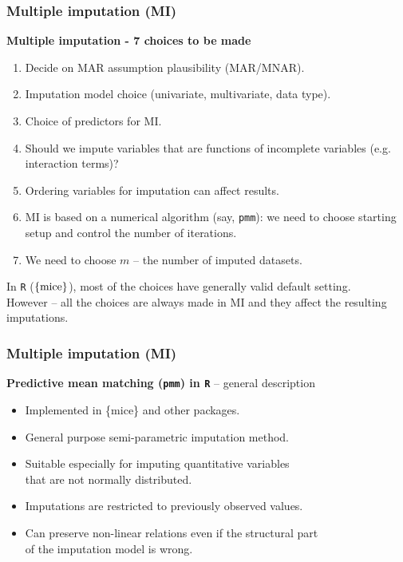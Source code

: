 \documentclass{beamer}
\begin{document}
\begin{frame}
\frametitle{Multiple imputation (MI)}
\textbf{Multiple imputation - 7 choices to be made}\\
\smallskip
\begin{enumerate}
    \item Decide on MAR assumption plausibility (MAR/MNAR).
    \item Imputation model choice (univariate, multivariate, data type).
    \item Choice of predictors for MI.
    \item Should we impute variables that are functions of incomplete variables (e.g. interaction terms)?
    \item Ordering variables for imputation can affect results.
    \item MI is based on a numerical algorithm (say, \texttt{pmm}): we need to choose starting setup and control the number of iterations.
    \item We need to choose $m$ -- the number of imputed datasets.
\end{enumerate}
\smallskip
In \texttt{R} ($\{ \textnormal{mice} \}$), most of the choices have generally valid default setting.\\
\smallskip
However -- all the choices are always made in MI and they affect the resulting imputations.
\end{frame}
\begin{frame}
\frametitle{Multiple imputation (MI)}
\textbf{Predictive mean matching (\texttt{pmm}) in \texttt{R}} -- general description\\
\bigskip
\begin{itemize}
    \item Implemented in \{mice\} and other packages.
    \medskip
    \item General purpose semi-parametric imputation method.
    \medskip
    \item Suitable especially for imputing quantitative variables \\that are not normally distributed.
    \medskip
    \item Imputations are restricted to previously observed values.
    \medskip
    \item Can preserve non-linear relations even if the structural part \\of the imputation model is wrong.
\end{itemize}
\end{frame}
\end{document}
